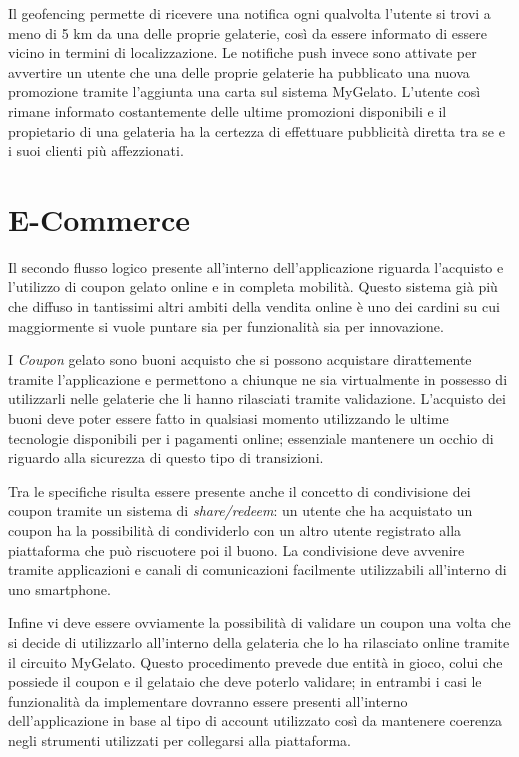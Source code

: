 Il geofencing permette di ricevere una notifica ogni qualvolta l'utente
si trovi a meno di 5 km da una delle proprie gelaterie, così da essere
informato di essere vicino in termini di localizzazione. Le notifiche
push invece sono attivate per avvertire un utente che una delle proprie
gelaterie ha pubblicato una nuova promozione tramite l'aggiunta una
carta sul sistema MyGelato. L'utente così rimane informato costantemente
delle ultime promozioni disponibili e il propietario di una gelateria
ha la certezza di effettuare pubblicità diretta tra se e i suoi clienti
più affezzionati.

\section{E-Commerce}

Il secondo flusso logico presente all'interno dell'applicazione riguarda
l'acquisto e l'utilizzo di coupon gelato online e in completa mobilità.
Questo sistema già più che diffuso in tantissimi altri ambiti della
vendita online è uno dei cardini su cui maggiormente si vuole puntare
sia per funzionalità sia per innovazione.\bigskip{}

I \emph{Coupon} gelato sono buoni acquisto che si possono acquistare
dirattemente tramite l'applicazione e permettono a chiunque ne sia
virtualmente in possesso di utilizzarli nelle gelaterie che li hanno
rilasciati tramite validazione. L'acquisto dei buoni deve poter essere
fatto in qualsiasi momento utilizzando le ultime tecnologie disponibili
per i pagamenti online; essenziale mantenere un occhio di riguardo
alla sicurezza di questo tipo di transizioni.\bigskip{}

Tra le specifiche risulta essere presente anche il concetto di condivisione
dei coupon tramite un sistema di \emph{share/redeem}: un utente che
ha acquistato un coupon ha la possibilità di condividerlo con un altro
utente registrato alla piattaforma che può riscuotere poi il buono.
La condivisione deve avvenire tramite applicazioni e canali di comunicazioni
facilmente utilizzabili all'interno di uno smartphone.\bigskip{}

Infine vi deve essere ovviamente la possibilità di validare un coupon
una volta che si decide di utilizzarlo all'interno della gelateria
che lo ha rilasciato online tramite il circuito MyGelato. Questo procedimento
prevede due entità in gioco, colui che possiede il coupon e il gelataio
che deve poterlo validare; in entrambi i casi le funzionalità da implementare
dovranno essere presenti all'interno dell'applicazione in base al
tipo di account utilizzato così da mantenere coerenza negli strumenti
utilizzati per collegarsi alla piattaforma.

